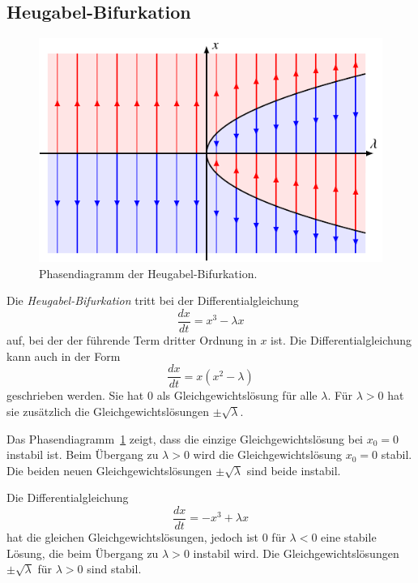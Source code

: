 \subsection{Heugabel-Bifurkation}
%
\begin{figure}
\centering
\includegraphics{chapters/3/pitchfork.pdf}
\caption{Phasendiagramm der Heugabel-Bifurkation.
\label{skript:dgl:pitchfork}}
\end{figure}
Die {\em Heugabel-Bifurkation} tritt bei der Differentialgleichung
\begin{equation}
\frac{dx}{dt} = x^3 - \lambda x
\label{skript:dgl:heugabel-dgl}
\end{equation}
auf, bei der der führende Term
dritter Ordnung in $x$ ist.
Die Differentialgleichung
kann auch in der Form
\[
\frac{dx}{dt}
=
x(x^2-\lambda)
\]
geschrieben werden.
Sie hat $0$ als Gleichgewichtslösung für alle $\lambda$.
Für $\lambda>0$ hat sie zusätzlich die Gleichgewichtslösungen
$\pm\!\sqrt{\lambda}$.

Das Phasendiagramm~\ref{skript:dgl:pitchfork} zeigt, dass
die einzige Gleichgewichtslösung bei $x_0=0$ instabil ist.
Beim Übergang zu $\lambda>0$ wird die Gleichgewichtslösung $x_0=0$
stabil.
Die beiden neuen Gleichgewichtslösungen $\pm\!\sqrt{\lambda}$ sind
beide instabil.

Die Differentialgleichung
\[
\frac{dx}{dt} = -x^3+\lambda x
\]
hat die gleichen Gleichgewichtslösungen, jedoch ist $0$ für
$\lambda<0$ eine stabile Lösung, die beim Übergang zu $\lambda>0$
instabil wird.
Die Gleichgewichtslösungen $\pm\!\sqrt{\lambda}$ für $\lambda >0$
sind stabil.

